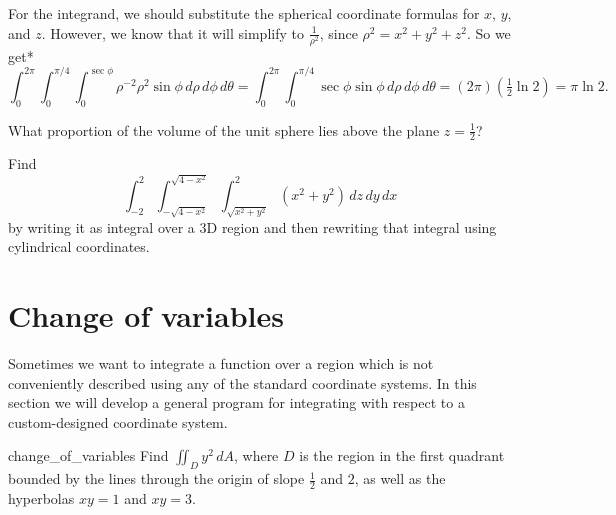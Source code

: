 \documentclass[svgnames]{report}
\begin{document}
\begin{solution}
For the integrand, we should substitute the spherical coordinate
formulas for $x$, $y$, and $z$. However, we know that it will simplify
to $\frac{1}{\rho^2}$, since $\rho^2 = x^2 + y^2 + z^2$. So we get*
\[
  \int_{0}^{2\pi}\int_0^{\pi/4} \int_0^{\sec \phi} \rho^{-2} \rho^2 \sin
  \phi \, d\rho \, d\phi \, d\theta =
  \int_{0}^{2\pi}\int_0^{\pi/4} \sec\phi \sin
  \phi \, d\rho \, d\phi \, d\theta = (2\pi)(\tfrac{1}{2} \ln 2) =
  \boxed{\pi \ln 2}.
\]
\end{solution}

\begin{exercise}{}{}
  What proportion of the volume of the unit sphere lies above the
  plane $z = \tfrac{1}{2}$?
\end{exercise}

\begin{exercise}{}{}
  Find \[\int_{-2}^2 \int_{-\sqrt{4-x^2}}^{\sqrt{4-x^2}}
  \int_{\sqrt{x^2 + y^2}}^2 (x^2 + y^2) \, dz \, dy \, dx\] by writing
  it as integral over a 3D region and then rewriting that integral
  using cylindrical coordinates. 
\end{exercise}

\section{Change of variables} \label{sec:changeofvariables}


Sometimes we want to integrate a function over a region which is not
conveniently described using any of the standard coordinate
systems. In this section we will develop a general program for
integrating with respect to a custom-designed coordinate system.

\begin{example}{}{change_of_variables}
  Find $\iint_D y^2 \, dA$, where $D$ is the region in the first
  quadrant bounded by the lines
  through the origin of slope $\tfrac{1}{2}$ and $2$, as well as the
  hyperbolas $xy = 1$ and $xy = 3$. 
\end{example}
\end{document}
